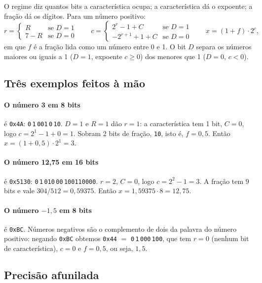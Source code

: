 \documentclass[11pt,a4paper]{article}
\newcommand{\code}[1]{\texttt{#1}}
\newcommand{\bS}[1]{\colorbox{gray!25}{\texttt{#1}}}
\newcommand{\bD}[1]{\colorbox{blue!18}{\texttt{#1}}}
\newcommand{\bR}[1]{\colorbox{blue!8}{\texttt{#1}}}
\newcommand{\bC}[1]{\colorbox{orange!25}{\texttt{#1}}}
\newcommand{\bF}[1]{\colorbox{green!18}{\texttt{#1}}}
\begin{document}
O regime diz quantos bits a característica ocupa; a característica dá o expoente; a fração dá os
dígitos. Para um número positivo:
\[
r = \begin{cases} R & \text{se } D=1\\ 7-R & \text{se } D=0 \end{cases}
\qquad
c = \begin{cases} 2^r - 1 + C & \text{se } D=1\\ -2^{r+1} + 1 + C & \text{se } D=0 \end{cases}
\qquad
x = (1 + f)\cdot 2^{c},
\]
em que $f$ é a fração lida como um número entre 0 e 1. O bit $D$ separa os números maiores ou iguais a 1
($D=1$, expoente $c\ge0$) dos menores que 1 ($D=0$, $c<0$).

\subsection{Três exemplos feitos à mão}

\paragraph{O número 3 em 8 bits} é \code{0x4A}:
\bS{0}\,\bD{1}\,\bR{001}\,\bC{0}\,\bF{10}.
$D=1$ e $R=1$ dão $r=1$: a característica tem 1 bit, $C=0$, logo $c=2^1-1+0=1$. Sobram 2 bits de fração,
\code{10}, isto é, $f=0{,}5$. Então $x=(1+0{,}5)\cdot2^1=3$.

\paragraph{O número 12,75 em 16 bits} é \code{0x5130}:
\bS{0}\,\bD{1}\,\bR{010}\,\bC{00}\,\bF{100110000}.
$r=2$, $C=0$, logo $c=2^2-1=3$. A fração tem 9 bits e vale $304/512=0{,}59375$. Então
$x=1{,}59375\cdot 8=12{,}75$.

\paragraph{O número $-1{,}5$ em 8 bits} é \code{0xBC}. Números negativos são o complemento de dois da
palavra do número positivo: negando \code{0xBC} obtemos \code{0x44} $=$
\bS{0}\,\bD{1}\,\bR{000}\,\bF{100}, que tem $r=0$ (nenhum bit de característica), $c=0$ e
$f=0{,}5$, ou seja, $1{,}5$.

\subsection{Precisão afunilada}
\end{document}
